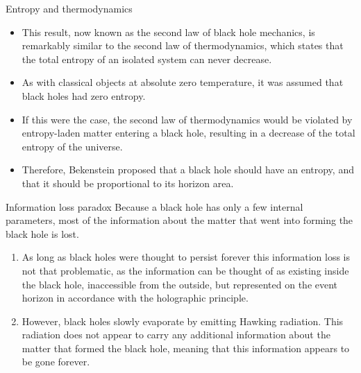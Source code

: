 \documentclass[20pt]{beamer}
\begin{document}
\begin{frame}[t]
\begin{columns}[t]
\begin{column}{0.32\linewidth}
\begin{block}{Entropy and thermodynamics}
\begin{itemize}

\item This result, now known as the second law of black hole mechanics, is remarkably similar to the second law of thermodynamics, which states that the total entropy of an isolated system can never decrease.

\item As with classical objects at absolute zero temperature, it was assumed that black holes had zero entropy.

\item If this were the case, the second law of thermodynamics would be violated by entropy-laden matter entering a black hole, resulting in a decrease of the total entropy of the universe.

\item Therefore, Bekenstein proposed that a black hole should have an entropy, and that it should be proportional to its horizon area.

\end{itemize}
    
\end{block}

\begin{block}{Information loss paradox}
Because a black hole has only a few internal parameters, most of the information about the matter that went into forming the black hole is lost. 
\begin{enumerate}

\item As long as black holes were thought to persist forever this information loss is not that problematic, as the information can be thought of as existing inside the black hole, inaccessible from the outside, but represented on the event horizon in accordance with the holographic principle.

\item However, black holes slowly evaporate by emitting Hawking radiation. This radiation does not appear to carry any additional information about the matter that formed the black hole, meaning that this information appears to be gone forever.

\end{enumerate}

\end{block}

\end{column}



\end{columns}
\end{frame}
\end{document}
